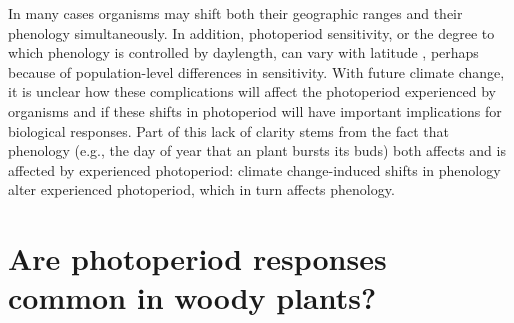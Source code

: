 \documentclass{article}
\begin{document}
\par In many cases organisms may shift both their geographic ranges and their phenology simultaneously. In addition, photoperiod sensitivity, or the degree to which phenology is controlled by daylength, can vary with latitude \citep{Howe:1996,saikkonen2012,Partanen:2005aa,Vihera-Aarnio:2006aa,Caffarra:2011b,gauzere2017}, perhaps because of population-level differences in sensitivity. With future climate change, it is unclear how these complications will affect the photoperiod experienced by organisms and if these shifts in photoperiod will have important implications for biological responses. Part of this lack of clarity stems from the fact that phenology (e.g., the day of year that an plant bursts its buds) both affects and is affected by experienced photoperiod: climate change-induced shifts in phenology alter experienced photoperiod, which in turn affects phenology.


\section*{Are photoperiod responses common in woody plants?}
\end{document}
